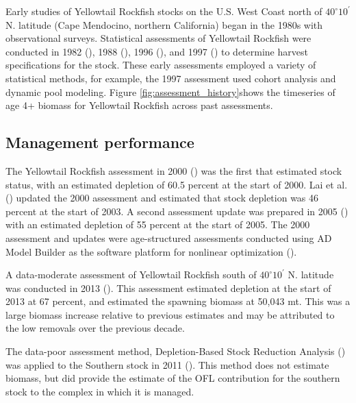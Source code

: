 \documentclass[
]{scrartcl}
\begin{document}
Early studies of Yellowtail Rockfish stocks on the U.S. West Coast north
of \(40^\circ 10^\prime\) N. latitude (Cape Mendocino, northern
California) began in the 1980s with observational surveys. Statistical
assessments of Yellowtail Rockfish were conducted in 1982
(), 1988
(), 1996
(), and 1997
() to determine harvest
specifications for the stock. These early assessments employed a variety
of statistical methods, for example, the 1997 assessment used cohort
analysis and dynamic pool modeling. Figure
\ref{fig:assessment_history}shows the timeseries of age 4+ biomass for
Yellowtail Rockfish across past assessments.

\subsection{Management performance}\label{management-performance-1}

The Yellowtail Rockfish assessment in 2000
() was the first that
estimated stock status, with an estimated depletion of 60.5 percent at
the start of 2000. Lai et al. ()
updated the 2000 assessment and estimated that stock depletion was 46
percent at the start of 2003. A second assessment update was prepared in
2005 () with an
estimated depletion of 55 percent at the start of 2005. The 2000
assessment and updates were age-structured assessments conducted using
AD Model Builder as the software platform for nonlinear optimization
().

A data-moderate assessment of Yellowtail Rockfish south of
\(40^\circ 10^\prime\) N. latitude was conducted in 2013
(). This assessment estimated
depletion at the start of 2013 at 67 percent, and estimated the spawning
biomass at 50,043 mt. This was a large biomass increase relative to
previous estimates and may be attributed to the low removals over the
previous decade.

The data-poor assessment method, Depletion-Based Stock Reduction
Analysis () was applied to
the Southern stock in 2011 ().
This method does not estimate biomass, but did provide the estimate of
the OFL contribution for the southern stock to the complex in which it
is managed.
\end{document}
